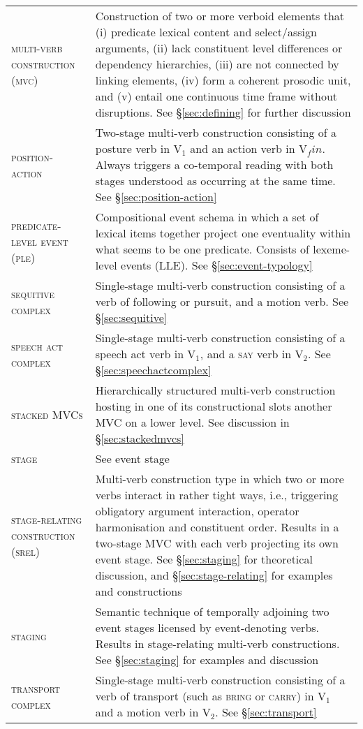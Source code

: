 \begin{footnotesize}
\begin{longtable}{p{4cm} p{8cm}}
\textsc{multi-verb construction (mvc)}  & Construction of two or more verboid elements that (i) predicate lexical content and select/assign arguments, (ii) lack constituent level differences or dependency hierarchies, (iii) are not connected by linking elements, (iv) form a coherent prosodic unit, and (v) entail one continuous time frame without disruptions. See §\ref{sec:defining} for further discussion  \\

\textsc{position-action}  & Two-stage multi-verb construction consisting of a posture verb in V$_1$ and an action verb in V$_fin$. Always triggers a co-temporal reading with both stages understood as occurring at the same time. See §\ref{sec:position-action} \\
 
\textsc{predicate-level event (ple)}  & Compositional event schema in which a set of lexical items together project one eventuality within what seems to be one predicate. Consists of lexeme-level events (LLE). See §\ref{sec:event-typology} \\

\textsc{sequitive complex}  & Single-stage multi-verb construction consisting of a verb of following or pursuit, and a motion verb. See §\ref{sec:sequitive} \\

\textsc{speech act complex}  & Single-stage multi-verb construction consisting of a speech act verb in V$_1$, and a \textsc{say} verb in V$_2$. See §\ref{sec:speechactcomplex} \\
 
\textsc{stacked MVCs}  & Hierarchically structured multi-verb construction hosting in one of its constructional slots another MVC on a lower level. See discussion in §\ref{sec:stackedmvcs} \\ 
 
\textsc{stage}  & See event stage \\
 
\textsc{stage-relating construction (srel)}  & Multi-verb construction type in which two or more verbs interact in rather tight ways, i.e., triggering obligatory argument interaction, operator harmonisation and constituent order. Results in a two-stage MVC with each verb projecting its own event stage. See §\ref{sec:staging} for theoretical discussion, and §\ref{sec:stage-relating} for examples and constructions  \\
 
\textsc{staging}  & Semantic technique of temporally adjoining two event stages licensed by event-denoting verbs. Results in stage-relating multi-verb constructions. See §\ref{sec:staging} for examples and discussion \\

\textsc{transport complex}  & Single-stage multi-verb construction consisting of a verb of transport (such as \textsc{bring} or \textsc{carry}) in V$_1$ and a motion verb in V$_2$. See §\ref{sec:transport} \\
\end{longtable} 
\end{footnotesize}
